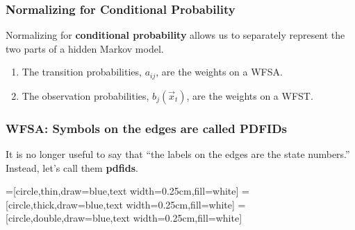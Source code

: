\documentclass{beamer}
\begin{document}
\begin{frame}
  \frametitle{Normalizing for Conditional Probability}

  Normalizing for {\bf conditional probability} allows us to
  separately represent the two parts of a hidden Markov model.
  \begin{enumerate}
  \item The transition probabilities, $a_{ij}$, are the weights on a
    WFSA.
  \item The observation probabilities, $b_j(\vec{x}_t)$, are the
    weights on a WFST.
  \end{enumerate}
\end{frame}

\begin{frame}
  \frametitle{WFSA: Symbols on the edges are called PDFIDs}

  It is no longer useful to say that ``the labels on the edges are
  the state numbers.''  Instead, let's call them {\bf pdfids}.

  \begin{center}
    =[circle,thin,draw=blue,text width=0.25cm,fill=white]
    =[circle,thick,draw=blue,text width=0.25cm,fill=white]
    =[circle,double,draw=blue,text width=0.25cm,fill=white]    
  \end{center}
\end{frame}
  
\end{document}

